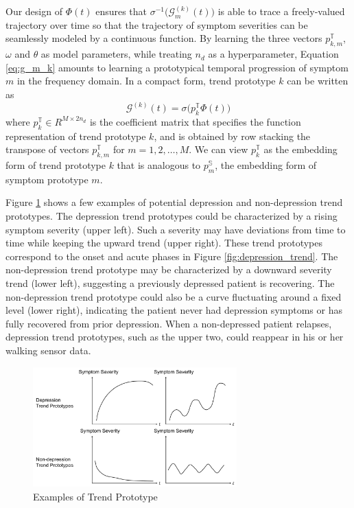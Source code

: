 \documentclass[mnsc]{informs3b} %
\begin{document}
Our design of $\Phi(t)$ ensures that $\sigma^{-1}\big( \mathcal{G}_{m}^{(k)}(t) \big)$ is able to trace a freely-valued trajectory over time so that the trajectory of symptom severities can be seamlessly modeled by a continuous function. 
By learning the three vectors $p_{k,m}^{\mathbb{T}}$, $\omega$ and $\theta $ as model parameters, while treating $n_d$ as a hyperparameter, Equation \ref{eq:g_m_k} amounts to learning a prototypical temporal progression of symptom $m$ in the frequency domain. In a compact form, trend prototype $k$ can be written as
\begin{equation}
\label{eq:g_k_t}
\mathcal{G}^{(k)}(t) = \sigma \big( p_k^{\mathbb{T}} \Phi(t) \big)
\end{equation}
where $p_k^{\mathbb{T}} \in R^{M \times 2 n_d}$ is the coefficient matrix that specifies the function representation of trend prototype $k$, and is obtained by row stacking the transpose of vectors $p_{k,m}^{\mathbb{T}}$ for $m=1,2,\dots,M$. We can view $p_k^{\mathbb{T}}$ as the embedding form of trend prototype $k$ that is analogous to $p_m^{\mathbb{S}}$, the embedding form of symptom prototype $m$.

Figure \ref{fig:trend_prototype} shows a few examples of potential depression and non-depression trend prototypes. The depression trend prototypes could be characterized by a rising symptom severity (upper left). Such a severity may have deviations from time to time while keeping the upward trend (upper right). These trend prototypes correspond to the onset and acute phases in Figure \ref{fig:depression_trend}. The non-depression trend prototype may be characterized by a downward severity trend (lower left), suggesting a previously depressed patient is recovering. The non-depression trend prototype could also be a curve fluctuating around a fixed level (lower right), indicating the patient never had depression symptoms or has fully recovered from prior depression. 
When a non-depressed patient relapses, depression trend prototypes, such as the upper two, could reappear in his or her walking sensor data.

\begin{figure}[h]
    \centering
    \includegraphics[width=0.7\textwidth]{imgs/trend_prototype.pdf}
    \caption{Examples of Trend Prototype}
    \label{fig:trend_prototype}
\end{figure}
\end{document}
